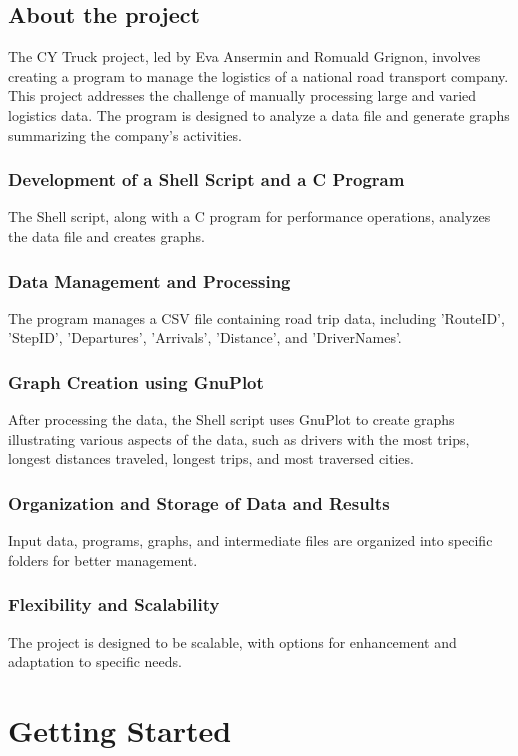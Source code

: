 \documentclass[11pt]{article}
\begin{document}
\subsection{About the project}
The CY Truck project, led by Eva Ansermin and Romuald Grignon, involves creating a program to manage the logistics of a national road transport company. This project addresses the challenge of manually processing large and varied logistics data. The program is designed to analyze a data file and generate graphs summarizing the company's activities.

\subsubsection{Development of a Shell Script and a C Program}
The Shell script, along with a C program for performance operations, analyzes the data file and creates graphs.

\subsubsection{Data Management and Processing}
The program manages a CSV file containing road trip data, including 'RouteID', 'StepID', 'Departures', 'Arrivals', 'Distance', and 'DriverNames'.

\subsubsection{Graph Creation using GnuPlot}
After processing the data, the Shell script uses GnuPlot to create graphs illustrating various aspects of the data, such as drivers with the most trips, longest distances traveled, longest trips, and most traversed cities.

\subsubsection{Organization and Storage of Data and Results}
Input data, programs, graphs, and intermediate files are organized into specific folders for better management.

\subsubsection{Flexibility and Scalability}
The project is designed to be scalable, with options for enhancement and adaptation to specific needs.

\newpage
\section{Getting Started}
\end{document}
